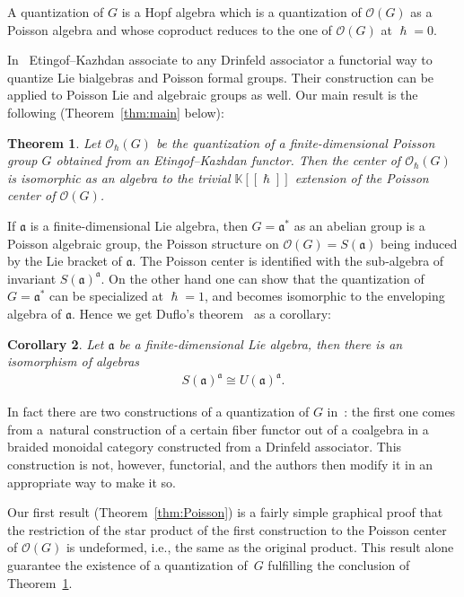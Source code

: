 \documentclass[pdftex]{sigma}
\numberwithin{equation}{section}
\newcommand{\mf}[1]{\mathfrak{#1}}
\newcommand{\h}{\hslash}
\newcommand{\cO}{\mathcal O}
\newcommand{\kk}{\mathbb K}
\newtheorem{thm}{Theorem}[section]
\newtheorem{cor}[thm]{Corollary}
\theoremstyle{definition}
\begin{document}
A quantization of $G$ is a Hopf algebra which is a quantization of $\cO(G)$ as a Poisson algebra and whose coproduct reduces to the one of $\cO(G)$ at $\h=0$.

In~\cite{Etingof1996} Etingof--Kazhdan associate to any Drinfeld associator a functorial way to quantize Lie bialgebras and Poisson formal groups. Their construction can be applied to Poisson Lie and algebraic groups as well. Our main result is the following (Theorem~\ref{thm:main} below):
\begin{thm}\label{thm:intro}
	Let $\cO_\h(G)$ be the quantization of a finite-dimensional Poisson group $G$ obtained from an Etingof--Kazhdan functor. Then the center of $\cO_\h(G)$ is isomorphic as an algebra to the trivial $\kk[[\h]]$ extension of the Poisson center of $\cO(G)$.
\end{thm}

If $\mf a$ is a f\/inite-dimensional Lie algebra, then $G=\mf a^*$ as an abelian group is a Poisson algebraic group, the Poisson structure on $\cO(G)=S(\mf a)$ being induced by the Lie bracket of $\mf a$. The Poisson center is identif\/ied with the sub-algebra of invariant $S(\mf a)^{\mf a}$. On the other hand one can show that the quantization of $G=\mf a^*$ can be specialized at $\h=1$, and becomes isomorphic to the enveloping algebra of $\mf a$. Hence we get Duf\/lo's theorem~\cite{Duflo1977} as a corollary:
\begin{cor}
Let $\mf a$ be a finite-dimensional Lie algebra, then there is an isomorphism of algebras
\begin{gather*}
	S(\mf a)^{\mf a}\cong U(\mf a)^{\mf a}.
\end{gather*}
\end{cor}

In fact there are two constructions of a quantization of $G$ in~\cite{Etingof1996}: the f\/irst one comes from a~natural construction of a certain f\/iber functor out of a coalgebra in a braided monoidal category constructed from a Drinfeld associator. This construction is not, however, functorial, and the authors then modify it in an appropriate way to make it so.

Our f\/irst result (Theorem~\ref{thm:Poisson}) is a fairly simple graphical proof that the restriction of the star product of the f\/irst construction to the Poisson center of $\cO(G)$ is undeformed, i.e., the same as the original product. This result alone guarantee the existence of a quantization of~$G$ fulf\/illing the conclusion of Theorem~\ref{thm:intro}.
\end{document}
